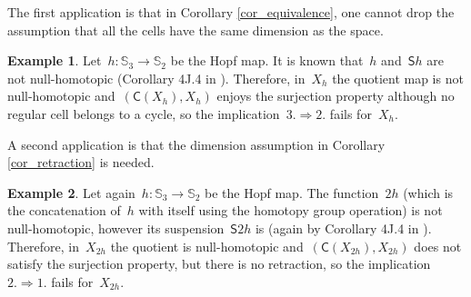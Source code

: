 \documentclass[english,11pt]{article}
\theoremstyle{plain}
\theoremstyle{remark}
\theoremstyle{definition}
\newtheorem{example}{Example}[section]
\newcommand{\Sp}{\mathbb{S}}
\newcommand{\BB}{\mathbb{B}}
\newcommand{\C}[1]{\mathsf{C}(#1)}%
\newcommand{\sus}{\mathsf{S}}
\begin{document}

The first application is that in Corollary \ref{cor_equivalence}, one cannot drop the assumption that all the cells have the same dimension as the space.
\begin{example}
Let~$h:\Sp_3\to\Sp_2$ be the Hopf map. It is known that~$h$ and~$\sus h$ are not null-homotopic (Corollary 4J.4 in \cite{Hatcher02}). Therefore, in~$X_h$ the quotient map is not null-homotopic and~$(\C{X_h},X_h)$ enjoys the surjection property although no regular cell belongs to a cycle, so the implication~$3.\Rightarrow 2.$ fails for~$X_h$.
\end{example}

A second application is that the dimension assumption in Corollary \ref{cor_retraction} is needed.

\begin{example}
Let again~$h:\Sp_3\to\Sp_2$ be the Hopf map. The function~$2h$ (which is the concatenation of~$h$ with itself using the homotopy group operation) is not null-homotopic, however its suspension~$\sus 2h$ is (again by Corollary 4J.4 in \cite{Hatcher02}). Therefore, in~$X_{2h}$ the quotient is null-homotopic and~$(\C{X_{2h}},X_{2h})$ does not satisfy the surjection property, but there is no retraction, so the implication $2.\Rightarrow 1.$ fails for~$X_{2h}$.
\end{example}
\end{document}
